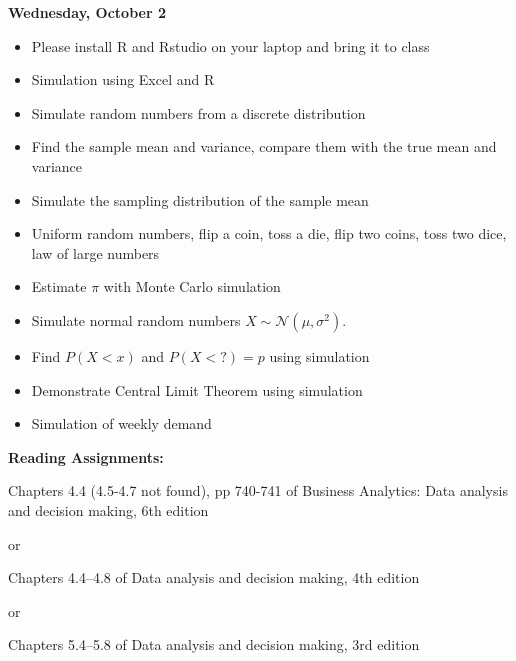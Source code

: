 \documentclass[11pt]{article}
\begin{document}
\vspace{5mm}
\noindent\textbf{\large Wednesday, October 2} 
\begin{itemize}
\item Please install R and Rstudio on your laptop and bring it to class
\item Simulation using Excel and R
\item Simulate random numbers from a discrete distribution
\item Find the sample mean and  variance, compare them with the true mean and variance
\item Simulate the sampling distribution of the sample mean 
\item Uniform random numbers, flip a coin, toss a die, flip two coins, toss two dice, law of large numbers
\item Estimate $\pi$ with Monte Carlo simulation
\item Simulate normal random numbers $X\sim\mathcal{N}(\mu,\sigma^2)$. 
\item Find $P(X<x)$ and $P(X<?)=p$ using simulation
\item Demonstrate Central Limit Theorem using simulation
\item Simulation of weekly demand

\end{itemize}
\noindent\textbf{Reading Assignments:}

Chapters 4.4 (4.5-4.7 not found), pp 740-741 of Business Analytics: Data analysis and decision making, 6th edition

or 

Chapters 4.4--4.8 of Data analysis and decision making, 4th edition

or 

Chapters 5.4--5.8  of  Data analysis and decision making, 3rd edition\\
\end{document}
